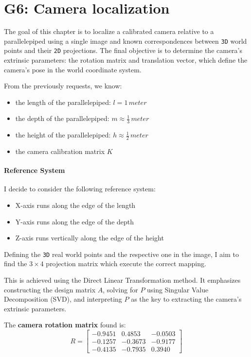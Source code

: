 \section{G6: Camera localization}
The goal of this chapter is to localize a calibrated camera relative to a parallelepiped using a single image and known correspondences between \verb|3D| world points and their \verb|2D| projections. The final objective is to determine the camera's extrinsic parameters: the rotation matrix and translation vector, which define the camera's pose in the world coordinate system.

From the previously requests, we know:
\begin{itemize}
    \item the length of the parallelepiped: $l = 1 \, meter$
    \item the depth of the parallelepiped: $m \approx \frac{1}{3} \, meter$
    \item the height of the parallelepiped: $h \approx \frac{1}{2} \, meter$
    \item the camera calibration matrix $K$
\end{itemize}

\paragraph{Reference System}

I decide to consider the following reference system:
\begin{itemize}
    \item X-axis runs along the edge of the length
    \item Y-axis runs along the edge of the depth
    \item Z-axis runs vertically along the edge of the height
\end{itemize}

Defining the \verb|3D| real world points and the respective one in the image, I aim to find the $3 \times 4$ projection matrix which execute the correct mapping.

This is achieved using the Direct Linear Transformation method. It emphasizes constructing the design matrix $A$, solving for $P$ using Singular Value Decomposition (SVD), and interpreting $P$ as the key to extracting the camera's extrinsic parameters.

The \textbf{camera rotation matrix} found is:
\[
    R
    =
    \begin{bmatrix}
        -0.9451 & 0.4853 & -0.0503 \\
        -0.1257 & -0.3673 & -0.9177 \\
        -0.4135 & -0.7935 & 0.3940
    \end{bmatrix}
\]

